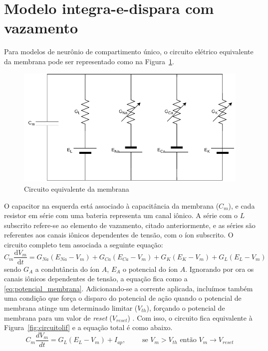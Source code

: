\section{Modelo integra-e-dispara com vazamento}\label{sec:modelolif}

Para modelos de neurônio de compartimento único, o circuito elétrico equivalente da membrana pode ser representado como na Figura~\ref{fig:circuitomembrana}.
\begin{figure}[htb!]
	\centering
	\caption{Circuito equivalente da membrana}
	\label{fig:circuitomembrana}
	\includegraphics[width=0.7\linewidth]{figs/circuito_membrana}
\end{figure}
O capacitor na esquerda está associado à capacitância da membrana ($C_m$), e cada resistor em série com uma bateria representa um canal iônico. A série com o $L$ subscrito refere-se ao elemento de vazamento, citado anteriormente, e as séries são referentes aos canais iônicos dependentes de tensão, com o íon subscrito. O circuito completo tem associada a seguinte equação:
\begin{equation}\label{eq:potencial_membrana_total}
	C_m\frac{\mathrm{d}V_m}{\mathrm{d}t}=G_{Na}(E_{Na}-V_m)+G_{Ca}(E_{Ca}-V_m)+G_K(E_K-V_m)+G_L(E_L-V_m)
\end{equation}
sendo $G_A$ a condutância do íon $A$, $E_A$ o potencial do íon $A$. Ignorando por ora os canais iônicos dependentes de tensão, a equação fica como a \ref{eq:potencial_membrana}. Adicionando-se a corrente aplicada, incluímos também uma condição que força o disparo do potencial de ação quando o potencial de membrana atinge um determinado limitar ($V_{th}$), forçando o potencial de membrana para um valor de \textit{reset} ($V_{reset}$) \cite{miller_introductory_2018}. Com isso, o circuito fica equivalente à Figura~\ref{fig:circuitolif} e a equação total é como abaixo.
\begin{equation}\label{eq:lif}
	C_m\frac{dV_m}{dt} = G_L(E_L-V_m)+I_{ap}, \qquad\text{ se } V_m > V_{th} \text{ então } V_m\to V_{reset}
\end{equation}
